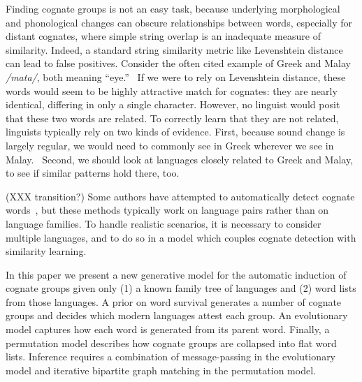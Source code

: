\documentclass[11pt,a4paper]{article}
\begin{document}
Finding cognate groups is not an easy task, because underlying
morphological and phonological changes can obscure relationships
between words, especially for distant cognates, where simple string
overlap is an inadequate measure of similarity. Indeed, a standard
string similarity metric like Levenshtein distance can lead to false
positives. Consider the often cited example of Greek
\textit{} and Malay \textit{/mata/}, both meaning
``eye.''~\cite{bloomfield38language} If we were to rely on
Levenshtein distance, these words would seem to be highly attractive
match for cognates: they are nearly identical, differing in only a
single character.  However, no linguist would posit that these two
words are related. To correctly learn that they are not related,
linguists typically rely on two kinds of evidence. First, because
sound change is largely regular, we would need to commonly see
\textit{} in Greek wherever we see
\textit{} in
Malay.~\cite{ross50philological} Second,
we should look at languages closely related to Greek and Malay, to
see if similar patterns hold there, too.

(XXX transition?) Some authors have
attempted to automatically detect cognate
words~\cite{mann01multipath,lowe94reconstruction,oakes00computer,Kondrak01identifyingcognates,mulloni07automatic},
but these methods typically work on language pairs rather than on
language families.  To handle realistic scenarios, it is
necessary to consider multiple languages, and to do so in a model
which couples cognate detection with similarity learning.

In this paper we present a new generative model for the automatic
induction of cognate groups given only (1) a known family tree of
languages and (2) word lists from those languages.  A prior on word
survival generates a number of cognate groups and decides which
modern languages attest each group.  An evolutionary model captures
how each word is generated from its parent word.  Finally, a
permutation model describes how cognate groups are collapsed into
flat word lists.  Inference requires a combination of message-passing
in the evolutionary model and iterative bipartite graph matching
in the permutation model.
\end{document}
